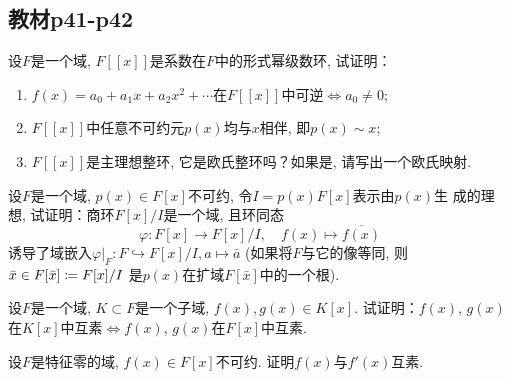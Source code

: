 \subsection{教材p41-p42}

\begin{problem}
    设$F$是一个域, $F[[x]]$是系数在$F$中的形式幂级数环, 试证明：
\begin{enumerate}[(1)]
    \item $f(x) = a_0 + a_1x + a_2x^2 + \cdots$在$F[[x]]$中可逆$\Leftrightarrow a_0 \neq 0$;
    \item $F[[x]]$中任意不可约元$p(x)$均与$x$相伴, 即$p(x) \sim x$;
    \item $F[[x]]$是主理想整环, 它是欧氏整环吗？如果是, 请写出一个欧氏映射.
\end{enumerate}
\end{problem}

\begin{solution}
    
\end{solution}

\begin{problem}
    设$F$是一个域, $p(x) \in F[x]$不可约, 令$I = p(x)F[x]$表示由$p(x)$生
成的理想, 试证明：商环$F[x]/I$是一个域, 且环同态
\[
    \varphi:F[x] \to F[x]/I,\quad f(x) \mapsto \overline{f(x)}
\]
诱导了域嵌入$\varphi|_F: F\hookrightarrow F[x]/I, a \mapsto \bar{a}$
(如果将$F$与它的像等同, 则$\bar{x} \in F[\bar{x}] \mathrel{\coloneqq} F[x]/I$
是$p(x)$在扩域$F[\bar{x}]$中的一个根).
\end{problem}

\begin{solution}
    
\end{solution}

\begin{problem}
    设$F$是一个域, $K \subset F$是一个子域, $f(x), g(x) \in K[x]$.
试证明：$f(x)$, $g(x)$在$K[x]$中互素$\Leftrightarrow f(x)$,
$g(x)$在$F[x]$中互素.
\end{problem}

\begin{solution}
    
\end{solution}

\begin{problem}
    设$F$是特征零的域, $f(x) \in F[x]$不可约. 证明$f(x)$与$f'(x)$互素.
\end{problem}

\begin{solution}
    
\end{solution}

